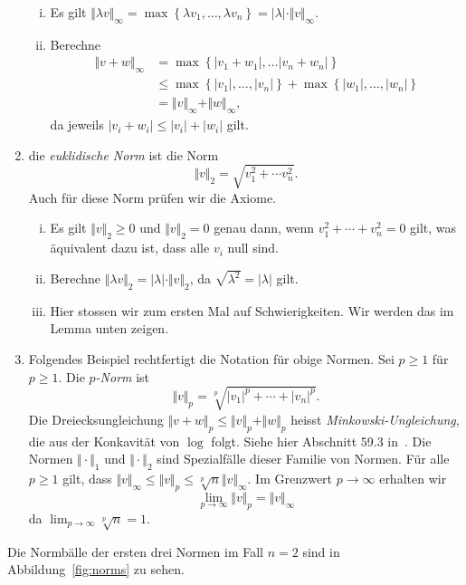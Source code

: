 \documentclass[../main.tex]{subfiles}
\begin{document}
\begin{examples}
\begin{enumerate}[(1)]
\begin{enumerate}[(i)]
        \item Es gilt $\Vert \lambda v \Vert_{\infty}
          = \max \left\{\lambda v_1, \dots, \lambda v_n\right\} = |\lambda|
          \cdot \Vert v \Vert_\infty$.
        \item Berechne
          \begin{align*}
            \Vert v + w \Vert_\infty
            &= \max \left\{|v_1 + w_1|, \dots |v_n + w_n|\right\} \\
            &\leq \max \left\{|v_{1}|, \dots, |v_{n}|\right\}
            + \max \left\{|w_{1}|, \dots, |w_{n}|\right\} \\
            &= \Vert v \Vert_{\infty} + \Vert w \Vert_{\infty},
          \end{align*}
          da jeweils $|v_i + w_i| \leq |v_i| + |w_i| $ gilt.
      \end{enumerate}
    \item die \emph{euklidische Norm} ist die Norm
      \[
        \Vert v \Vert_2 = \sqrt{v_1^2 + \cdots v_n^2}.
      \]
      Auch für diese Norm prüfen wir die Axiome.
      \begin{enumerate}[(i)]
        \item Es gilt $\Vert v \Vert_2 \geq 0$ und
          $\Vert v \Vert_2 = 0$ genau dann, wenn
          $v_1^2 + \cdots + v_n^2 = 0$ gilt,
          was äquivalent dazu ist, dass alle $v_i$ null sind.
        \item Berechne $\Vert \lambda v \Vert_2 = |\lambda | \cdot
          \Vert v \Vert_2$, da $\sqrt{\lambda^2} = |\lambda|$ gilt.
        \item Hier stossen wir zum ersten Mal auf Schwierigkeiten.
          Wir werden das im Lemma unten zeigen.
      \end{enumerate}
    \item 
      Folgendes Beispiel rechtfertigt die Notation
      für obige Normen. Sei $p \geq 1$ für $p \geq 1$.
      Die \emph{$p$-Norm} ist
       \[
         \Vert v \Vert_p = \sqrt[p]{|v_1|^p + \cdots + |v_n|^p}.
      \]
      Die Dreiecksungleichung $\Vert v + w \Vert_p \leq
      \Vert v \Vert_p + \Vert w \Vert_p$ heisst
      \emph{Minkowski-Ungleichung}, die aus der
      Konkavität von $\log$ folgt. Siehe hier Abschnitt
      59.3 in~\cite{heuser}.
      Die Normen $\Vert \cdot \Vert_1$ und $\Vert \cdot \Vert_2$ 
      sind Spezialfälle dieser Familie von Normen.
      Für alle $p \geq 1$ gilt, dass $\Vert v \Vert_{\infty}
      \leq \Vert v \Vert_p \leq \sqrt[p]{n} \Vert v \Vert_{\infty}$.
      Im Grenzwert $p \to \infty$ erhalten wir
      \[
        \lim_{p \to \infty} \Vert v \Vert_p = \Vert v \Vert_{\infty}
      \]
      da $\lim_{p \to \infty} \sqrt[p]{n} = 1$.
  \end{enumerate}
  Die Normbälle der ersten drei Normen im Fall $n = 2$
  sind in Abbildung~\ref{fig:norms}
  zu sehen.
\end{examples}
\end{document}
